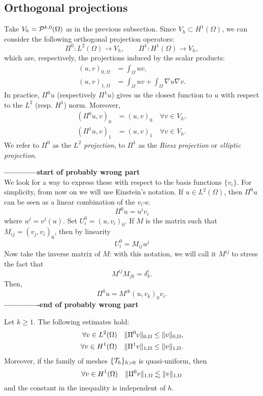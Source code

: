 \subsection{Orthogonal projections}

Take $V_h = \P^{k,0}(\Omega)$ as in the previous subsection. Since $V_h \subset H^1(\Omega)$, we can consider the following orthogonal projection operators:
\[
    \Pi^0: L^2(\Omega) \to V_h, \qquad
    \Pi^1: H^1(\Omega) \to V_h,
\]
which are, respectively, the projections induced by the scalar products:
\begin{align}
    (u,v)_{0,\Omega} &= \int_\Omega uv, \\
    (u,v)_{1,\Omega} &= \int_\Omega uv + \int_\Omega \nabla u \nabla v.
\end{align}
In practice, $\Pi^0 u$ (respectively $\Pi^1 u$) gives us the closest function to $u$ with respect to the $L^2$ (resp. $H^1$) norm. Moreover,
\begin{align}
    (\Pi^0 u, v)_0 &= (u, v)_0 \quad \forall v \in V_h, \\
    (\Pi^1 u, v)_1 &= (u, v)_1 \quad \forall v \in V_h.
\end{align}
We refer to $\Pi^0$ as the \emph{$L^2$ projection}, to $\Pi^1$ as the \emph{Riesz projection} or \emph{elliptic projection}.

\textbf{------------start of probably wrong part\\}
We look for a way to express these with respect to the basis functions $\{v_i\}$. For simplicity, from now on we will use Einstein's notation. If $u \in L^2(\Omega)$, then $\Pi^0 u$ can be seen as a linear combination of the $v_i$-s:
\[
\Pi^0 u = u^i v_i
\]
where $u^j = v^j(u)$.
Set $U^0_i = (u,v_i)_0$. If $M$ is the matrix such that $M_{ij} = (v_j, v_i)_0$, then by linearity
\[
U^0_i = M_{ij} u^j
\]
Now take the inverse matrix of $M$: with this notation, we will call it $M^{ij}$ to stress the fact that
\[
M^{ij} M_{jk} = \delta^i_k.
\]
Then,
\[
\Pi^0 u = M^{ik} (u,v_k)_0 v_i.
\]
\textbf{-------------end of probably wrong part}

\begin{lemma}
    Let $k\ge1$. The following estimates hold:
    \begin{align}
        \forall v \in L^2(\Omega) \quad \norm{\Pi^0 v}_{0,\Omega} &\le \norm{v}_{0,\Omega}, \\
        \forall v \in H^1(\Omega) \quad \norm{\Pi^1 v}_{1,\Omega} &\le \norm{v}_{1,\Omega}.
    \end{align}
    Moreover, if the family of meshes $\{\T_h\}_{h>0}$ is quasi-uniform, then
    \[
        \forall v \in H^1(\Omega) \quad \norm{\Pi^0 v}_{1,\Omega} \lesssim \norm{v}_{1,\Omega}
    \]
    and the constant in the inequality is independent of $h$.
\end{lemma}

